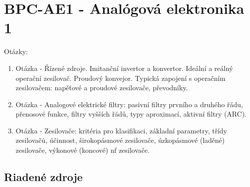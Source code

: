 \part{BPC-AE1 - Analógová elektronika 1}
\begin{huge}
	Otázky:
	\newline
\end{huge}
\begin{enumerate}
	\item Otázka - Řízené zdroje. Imitanční invertor a konvertor. Ideální a reálný operační zesilovač. Proudový konvejor. Typická zapojení s operačním zesilovačem: napěťové a proudové zesilovače, převodníky. 
	\item Otázka - Analogové elektrické filtry: pasivní filtry prvního a druhého řádu, přenosové funkce, filtry vyšších řádů, typy aproximací, aktivní filtry (ARC).
	\item Otázka - Zesilovače: kritéria pro klasifikaci, základní parametry, třídy zesilovačů, účinnost, širokopásmové zesilovače, úzkopásmové (laděné) zesilovače, výkonové (koncové) nf zesilovače. 
\end{enumerate}
\newpage
\chapter{Riadené zdroje}
